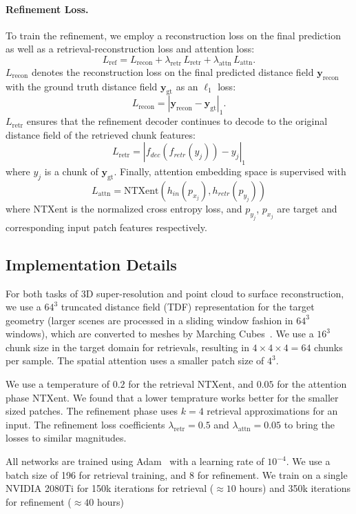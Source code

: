 \paragraph{Refinement Loss.}
To train the refinement, we employ a reconstruction loss on the final prediction as well as a retrieval-reconstruction loss and attention loss:
\begin{equation}
    L_{\mathrm{ref}} = L_{\mathrm{recon}} + \lambda_{\mathrm{retr}}\,L_{\mathrm{retr}} + \lambda_{\mathrm{attn}}\,L_{\mathrm{attn}}.
\end{equation}
$L_{\mathrm{recon}}$ denotes the reconstruction loss on the final predicted distance field $\mathbf{y}_{\textrm{recon}}$ with the ground truth distance field $\mathbf{y}_{\textrm{gt}}$ as an $\ell_1$ loss:
\begin{equation}
    L_{\mathrm{recon}} = |\mathbf{y}_{\textrm{recon}} - \mathbf{y}_{\textrm{gt}}|_1.
\end{equation} 
%
$L_{\mathrm{retr}}$ ensures that the refinement decoder continues to decode to the original distance field of the retrieved chunk features: 
\begin{equation}
    L_{\mathrm{retr}} = |f_{dec}(f_{retr}(y_j)) - y_j|_1
\end{equation}
where $y_j$ is a chunk of $\mathbf{y}_{\textrm{gt}}$.
%
Finally, attention embedding space is supervised with
\begin{equation}
    L_{\mathrm{attn}} = \mathrm{NTXent}(h_{in}(p_{x_j}), h_{retr}(p_{y_j})) 
\end{equation} 
where NTXent is the normalized cross entropy loss, and $p_{y_j}$, $p_{x_j}$ are target and corresponding input patch features respectively. 

\subsection{Implementation Details}
%
For both tasks of 3D super-resolution and point cloud to surface reconstruction, we use a $64^3$ truncated distance field (TDF) representation for the target geometry (larger scenes are processed in a sliding window fashion in $64^3$ windows), which are converted to meshes by Marching Cubes~\cite{lorensen1987marching}. 
We use a $16^3$ chunk size in the target domain for retrievals, resulting in $4\times4\times4=64$ chunks per sample. 
%
The spatial attention uses a smaller patch size of $4^3$. 
%

We use a temperature of $0.2$ for the retrieval NTXent, and $0.05$ for the attention phase NTXent. We found that a lower temprature works better for the smaller sized patches.
%
The refinement phase uses $k = 4$ retrieval approximations for an input.
%
The refinement loss coefficients $\lambda_{\mathrm{retr}} = 0.5$ and $\lambda_{\mathrm{attn}} = 0.05$ to bring the losses to similar magnitudes.

All networks are trained using Adam~\cite{kingma2014adam} with a learning rate of $10^{-4}$. We use a batch size of 196 for retrieval training, and 8 for refinement. 
We train on a single NVIDIA 2080Ti for 150k iterations for retrieval ($\approx 10$ hours) and 350k iterations for refinement ($\approx 40$ hours)
%